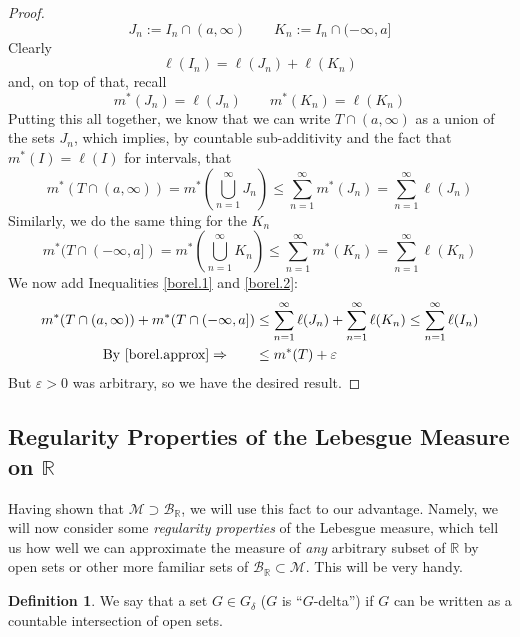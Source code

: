 \documentclass[12pt]{article}
\theoremstyle{plain}
\theoremstyle{definition}
\newtheorem{defn}[thm]{Definition}
\theoremstyle{remark}
\begin{document}
\begin{proof}
\[
    J_n := I_n \cap (a,\infty)
    \qquad
    K_n := I_n \cap (-\infty,a]
\]
Clearly
\[
    \ell(I_n) = \ell(J_n) + \ell(K_n)
\]
and, on top of that, recall 
\[
    m^*(J_n) = \ell(J_n) 
    \qquad
    m^*(K_n) = \ell(K_n) 
\]
Putting this all together, we know that we can write $T\cap (a,\infty)$ as a union of the sets $J_n$, which implies, by countable sub-additivity and the fact that $m^*(I) = \ell(I)$ for intervals, that
\begin{equation}
    \label{borel.1}
    m^*(T \cap (a,\infty)) =
    m^*\left(\bigcup^\infty_{n=1} J_n\right) 
    \leq \sum^\infty_{n=1}
    m^*(J_n) = \sum^\infty_{n=1} \ell(J_n)
\end{equation}
Similarly, we do the same thing for the $K_n$
\begin{equation}
    \label{borel.2}
    m^*(T \cap (-\infty,a]) =
    m^*\left(\bigcup^\infty_{n=1} K_n\right) 
    \leq \sum^\infty_{n=1}
    m^*(K_n) = \sum^\infty_{n=1} \ell(K_n)
\end{equation}
We now add Inequalities \ref{borel.1} and \ref{borel.2}:
\begin{align*}
    m^*(T \cap (a,\infty)) +
    m^*(T \cap (-\infty,a]) &\leq
    \sum^\infty_{n=1} \ell(J_n)
    + \sum^\infty_{n=1} \ell(K_n) 
    \leq \sum^\infty_{n=1} \ell(I_n) \\
    \text{By \ref{borel.approx}} \Rightarrow
    \qquad &\leq m^*(T) + \varepsilon
\end{align*}
But $\varepsilon>0$ was arbitrary, so we have the desired result.
\end{proof}






\subsection{Regularity Properties of the Lebesgue Measure on $\mathbb{R}$}


Having shown that $\mathscr{M}\supset \mathscr{B}_\mathbb{R}$, we will use this fact to our advantage. Namely, we will now consider some \emph{regularity properties} of the Lebesgue measure, which tell us how well we can approximate the measure of \emph{any} arbitrary subset of $\mathbb{R}$ by open sets or other more familiar sets of $\mathscr{B}_\mathbb{R}\subset\mathscr{M}$. This will be very handy.

\begin{defn}
We say that a set $G\in G_\delta$ ($G$ is ``$G$-delta'') if $G$ can be written as a countable intersection of open sets.
\end{defn}
\end{document}
